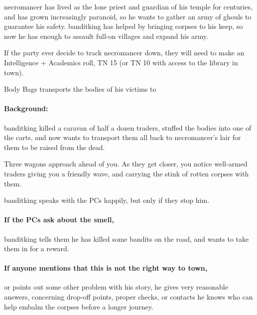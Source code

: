 \begin{multicols}{2}

\nurabaron

\stopcontents[sq]

\resumecontents[Forest]
\resumecontents[Town]
\stopcontents[Town]
\stopcontents[Forest]

\startcontents[sq]

\sqminitoc

\noindent
\Gls{necromancer} has lived as the lone priest and guardian of his temple for centuries, and has grown increasingly paranoid, so he wants to gather an army of ghouls to guarantee his safety.
\Gls{banditking} has helped by bringing corpses to his keep, so now he has enough to assault full-on villages and expand his army.

If the party ever decide to track \gls{necromancer} down, they will need to make an Intelligence + Academics roll, TN 15 (or TN 10 with access to the library in town).

{Body Bags}%
{ transports the bodies of his victims to }%

\paragraph{Background:}
\Gls{banditking} killed a caravan of half a dozen traders, stuffed the bodies into one of the carts, and now wants to transport them all back to \gls{necromancer}'s lair for them to be raised from the dead.

\begin{boxtext}
  Three wagons approach ahead of you.
  As they get closer, you notice well-armed traders giving you a friendly wave, and carrying the stink of rotten corpses with them.
\end{boxtext}

\Gls{banditking} speaks with the PCs happily, but only if they stop him.

\paragraph{If the PCs ask about the smell,}
\gls{banditking} tells them he has killed some bandits on the road, and wants to take them in for a reward.

\paragraph{If anyone mentions that this is not the right way to \gls{town},}
or points out some other problem with his story, he gives very reasonable answers, concerning drop-off points, proper checks, or contacts he knows who can help embalm the corpses before a longer journey.


\end{multicols}
